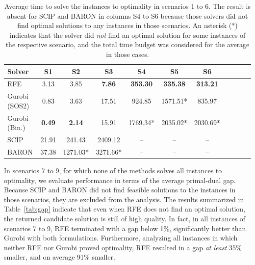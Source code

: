 \documentclass[pdflatex,sn-mathphys-num]{sn-jnl}%
\newcommand{\new}[1]{#1}
\begin{document}
\begin{table}[ht]
\centering
\caption{\new{Average time to solve the instances to optimality in scenarios 1 to 6. The result is absent for SCIP and BARON in columns S4 to S6 because those solvers did not find optimal solutions to any instances in those scenarios. An asterisk (*) indicates that the solver did \emph{not} find an optimal solution for some instances of the respective scenario, and the total time budget was considered for the average in those cases.}} \label{tab:times}
\new{%
\begin{tabular}{l
                cccccccccc}
\toprule
Solver          & S1          & S2          & S3             & S4             & S5             & S6          \\
\midrule
RFE             &        3.13 &         3.85 & \textbf{7.86} & \textbf{353.30}& \textbf{335.38}& \textbf{313.21}\\
Gurobi (SOS2)   &        0.83 &         3.63 &        17.51  &         924.85 &        1571.51*&        835.97  \\
Gurobi (Bin.)   &\textbf{0.49}& \textbf{2.14}&        15.91  &        1769.34*&        2035.02*&       2030.69* \\
SCIP            &       21.91 &       241.43 &      2409.12  &             -- &           --   &            --  \\
BARON           &       37.38 &      1271.03*&      3271.66* &             -- &           --   &            --  \\
\bottomrule
\end{tabular}
}
\end{table}

\new{%
In scenarios 7 to 9, for which none of the methods solves all instances to optimality, we evaluate performance in terms of the average primal-dual gap.
Because SCIP and BARON did not find feasible solutions to the instances in those scenarios, they are excluded from the analysis.
The results summarized in Table~\ref{tab:gap} indicate that even when RFE does not find an optimal solution, the returned candidate solution is still of high quality.
In fact, in all instances of scenarios 7 to 9, RFE terminated with a gap below 1\%, significantly better than Gurobi with both formulations.
Furthermore, analyzing all instances in which neither RFE nor Gurobi proved optimality, RFE resulted in a gap \emph{at least} 35\% smaller, and on average 91\% smaller.
}
\end{document}
